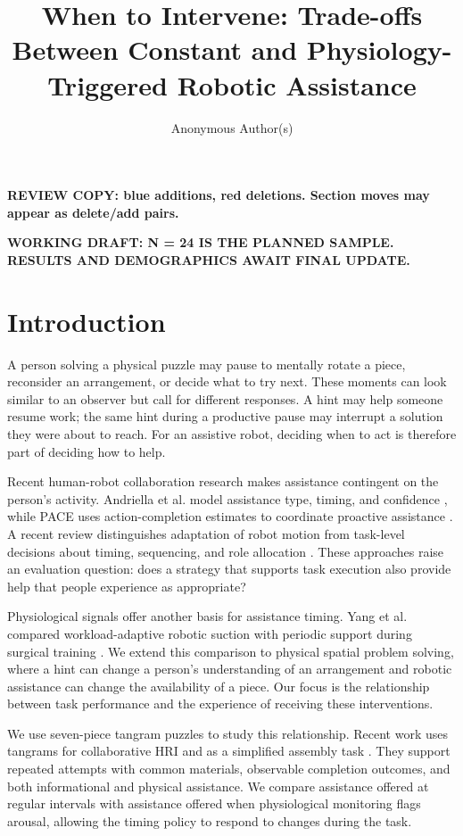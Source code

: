 \documentclass[sigconf,anonymous,balance=false]{aamas}
\title{When to Intervene: Trade-offs Between Constant and Physiology-Triggered Robotic Assistance}
\author{Anonymous Author(s)}
\begin{document}
\maketitle
\noindent\textbf{REVIEW COPY: blue additions, red deletions. Section moves may appear as delete/add pairs.}\par

\noindent\textbf{WORKING DRAFT: N = 24 IS THE PLANNED SAMPLE. RESULTS AND DEMOGRAPHICS AWAIT FINAL UPDATE.}

\section{Introduction}

A person solving a physical puzzle may pause to mentally rotate a piece, reconsider an arrangement, or decide what to try next. These moments can look similar to an observer but call for different responses. A hint may help someone resume work; the same hint during a productive pause may interrupt a solution they were about to reach. For an assistive robot, deciding when to act is therefore part of deciding how to help.

Recent human-robot collaboration research makes assistance contingent on the person's activity. Andriella et al. model assistance type, timing, and confidence \cite{andriella2025}, while PACE uses action-completion estimates to coordinate proactive assistance \cite{delazzari2025}. A recent review distinguishes adaptation of robot motion from task-level decisions about timing, sequencing, and role allocation \cite{karbouj2026}. These approaches raise an evaluation question: does a strategy that supports task execution also provide help that people experience as appropriate?

Physiological signals offer another basis for assistance timing. Yang et al. compared workload-adaptive robotic suction with periodic support during surgical training \cite{yang2024}. We extend this comparison to physical spatial problem solving, where a hint can change a person's understanding of an arrangement and robotic assistance can change the availability of a piece. Our focus is the relationship between task performance and the experience of receiving these interventions.

We use seven-piece tangram puzzles to study this relationship. Recent work uses tangrams for collaborative HRI and as a simplified assembly task \cite{tabatabaei2025,melo2026}. They support repeated attempts with common materials, observable completion outcomes, and both informational and physical assistance. We compare assistance offered at regular intervals with assistance offered when physiological monitoring flags arousal, allowing the timing policy to respond to changes during the task.
\end{document}
